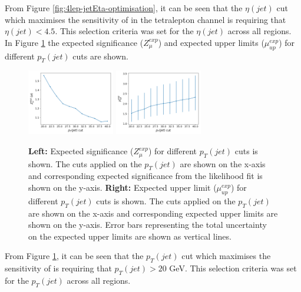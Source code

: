 From Figure \ref{fig:4lep-jetEta-optimisation}, it can be seen that the $\eta(jet)$ cut which maximises the sensitivity of \tWZ in the tetralepton channel is requiring that $\eta(jet) < 4.5$. This selection criteria was set for the $\eta(jet)$ across all regions.\\

In Figure \ref{fig:4lep-jetpt-optimisation} the expected significance ($Z_{\mu}^{exp}$) and expected upper limits ($\mu_{up}^{exp}$) for different $p_{T}(jet)$ cuts are shown.
\begin{figure}[h!]
	\includegraphics[width = 0.34\textwidth]{figures/signif_jetPt.png}
  	\includegraphics[width = 0.34\textwidth]{figures/exp_upper_jetPt.png}
  \centering
	\caption{\textbf{Left:} Expected significance ($Z_{\mu}^{exp}$) for different $p_{T}(jet)$ cuts is shown. The cuts applied on the $p_{T}(jet)$ are shown on the x-axis and corresponding expected significance from the likelihood fit is shown on the y-axis. \textbf{Right:} Expected upper limit ($\mu_{up}^{exp}$) for different $p_{T}(jet)$ cuts is shown. The cuts applied on the $p_{T}(jet)$ are shown on the x-axis and corresponding expected upper limits are shown on the y-axis. Error bars representing the total uncertainty on the expected upper limits are shown as vertical lines.}
		\label{fig:4lep-jetpt-optimisation}
\end{figure}


From Figure \ref{fig:4lep-jetpt-optimisation}, it can be seen that the $p_{T}(jet)$ cut which maximises the sensitivity of \tWZ is requiring that $p_{T}(jet) > 20$ GeV. This selection criteria was set for the $p_{T}(jet)$ across all regions.\\

